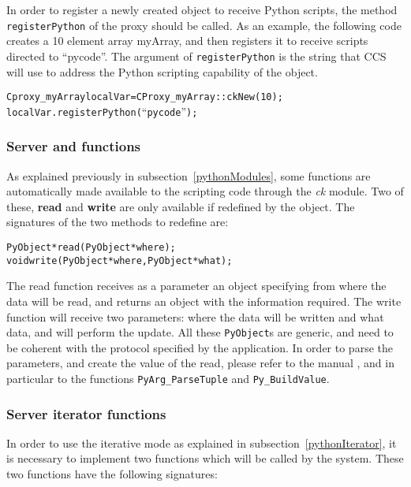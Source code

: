 In order to register a newly created object to receive Python scripts, the
method \texttt{registerPython} of the proxy should be called. As an example,
the following code creates a 10 element array myArray, and then registers it to
receive scripts directed to ``pycode''. The argument of \texttt{registerPython}
is the string that CCS will use to address the Python scripting capability of
the object.

\begin{alltt}
Cproxy_myArray localVar = CProxy_myArray::ckNew(10);
localVar.registerPython(``pycode'');
\end{alltt}


\subsubsection{Server  and  functions}

\label{pythonServerRW}

As explained previously in subsection~\ref{pythonModules}, some functions are
automatically made available to the scripting code through the {\em ck} module.
Two of these, \textbf{read} and \textbf{write} are only available if redefined
by the object. The signatures of the two methods to redefine are:

\begin{alltt}
PyObject* read(PyObject* where);
void write(PyObject* where, PyObject* what);
\end{alltt}

The read function receives as a parameter an object specifying from where the data
will be read, and returns an object with the information required. The write
function will receive two parameters: where the data will be written and what
data, and will perform the update. All these \texttt{PyObject}s are generic, and
need to be coherent with the protocol specified by the application. In order to
parse the parameters, and create the value of the read, please refer to the
manual , and in particular to the functions
\texttt{PyArg\_ParseTuple} and \texttt{Py\_BuildValue}.

\subsubsection{Server iterator functions}

\label{pythonServerIterator}

In order to use the iterative mode as explained in
subsection~\ref{pythonIterator}, it is necessary to implement two functions
which will be called by the system. These two functions have the following
signatures:

